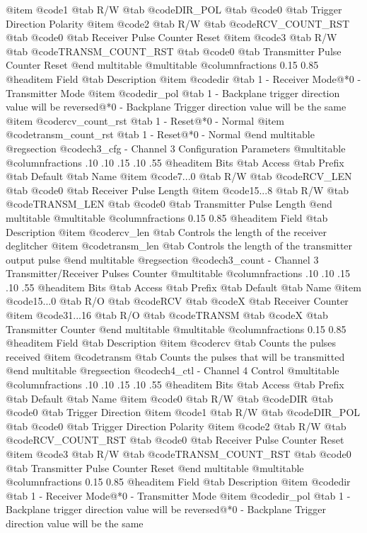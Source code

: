 @item @code{1}
@tab R/W @tab
@code{DIR_POL}
@tab @code{0} @tab 
Trigger Direction Polarity
@item @code{2}
@tab R/W @tab
@code{RCV_COUNT_RST}
@tab @code{0} @tab 
Receiver Pulse Counter Reset
@item @code{3}
@tab R/W @tab
@code{TRANSM_COUNT_RST}
@tab @code{0} @tab 
Transmitter Pulse Counter Reset
@end multitable
@multitable @columnfractions 0.15 0.85
@headitem Field @tab Description
@item @code{dir} @tab 1 - Receiver Mode@*0 - Transmitter Mode
@item @code{dir_pol} @tab 1 - Backplane trigger direction value will be reversed@*0 - Backplane Trigger direction value will be the same
@item @code{rcv_count_rst} @tab 1 - Reset@*0 - Normal
@item @code{transm_count_rst} @tab 1 - Reset@*0 - Normal
@end multitable
@regsection @code{ch3_cfg} - Channel 3 Configuration Parameters
@multitable @columnfractions .10 .10 .15 .10 .55
@headitem Bits @tab Access @tab Prefix @tab Default @tab Name
@item @code{7...0}
@tab R/W @tab
@code{RCV_LEN}
@tab @code{0} @tab 
Receiver Pulse Length
@item @code{15...8}
@tab R/W @tab
@code{TRANSM_LEN}
@tab @code{0} @tab 
Transmitter Pulse Length
@end multitable
@multitable @columnfractions 0.15 0.85
@headitem Field @tab Description
@item @code{rcv_len} @tab Controls the length of the receiver deglitcher
@item @code{transm_len} @tab Controls the length of the transmitter output pulse
@end multitable
@regsection @code{ch3_count} - Channel 3 Transmitter/Receiver Pulses Counter
@multitable @columnfractions .10 .10 .15 .10 .55
@headitem Bits @tab Access @tab Prefix @tab Default @tab Name
@item @code{15...0}
@tab R/O @tab
@code{RCV}
@tab @code{X} @tab 
Receiver Counter
@item @code{31...16}
@tab R/O @tab
@code{TRANSM}
@tab @code{X} @tab 
Transmitter Counter
@end multitable
@multitable @columnfractions 0.15 0.85
@headitem Field @tab Description
@item @code{rcv} @tab Counts the pulses received
@item @code{transm} @tab Counts the pulses that will be transmitted
@end multitable
@regsection @code{ch4_ctl} - Channel 4 Control
@multitable @columnfractions .10 .10 .15 .10 .55
@headitem Bits @tab Access @tab Prefix @tab Default @tab Name
@item @code{0}
@tab R/W @tab
@code{DIR}
@tab @code{0} @tab 
Trigger Direction
@item @code{1}
@tab R/W @tab
@code{DIR_POL}
@tab @code{0} @tab 
Trigger Direction Polarity
@item @code{2}
@tab R/W @tab
@code{RCV_COUNT_RST}
@tab @code{0} @tab 
Receiver Pulse Counter Reset
@item @code{3}
@tab R/W @tab
@code{TRANSM_COUNT_RST}
@tab @code{0} @tab 
Transmitter Pulse Counter Reset
@end multitable
@multitable @columnfractions 0.15 0.85
@headitem Field @tab Description
@item @code{dir} @tab 1 - Receiver Mode@*0 - Transmitter Mode
@item @code{dir_pol} @tab 1 - Backplane trigger direction value will be reversed@*0 - Backplane Trigger direction value will be the same
